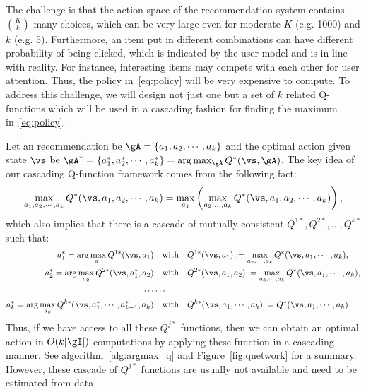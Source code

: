 \documentclass{article} %
\newcommand{\Le}[1]{{\color{red}{\bf\sf [ #1]}}}
\begin{document}
The challenge is that the action space of the recommendation system contains ${K \choose k}$ many choices, which can be very large even for moderate $K$ (e.g. 1000) and $k$ (e.g. 5). Furthermore, an item put in different combinations can have different probability of being clicked, which is indicated by the user model and is in line with reality. For instance, interesting items may compete with each other for user attention. Thus, the policy in~\eqref{eq:policy} will be very expensive to compute. To address this challenge, we will design not just one but a set of $k$ related Q-functions which will be used in a cascading fashion for finding the maximum in~\eqref{eq:policy}.

Let an recommendation be $\gA=\{a_1, a_2,\cdots, a_k\}$ and the optimal action given state $\vs$ be $\gA^* =\{a_1^*, a_2^*, \cdots, a_k^*\} =\arg\max_{\gA} Q^*(
\vs, \gA)$. The key idea of our cascading Q-function framework comes from the following fact:
{\small \begin{equation}\label{eq:max_decomp}
\max_{a_1,a_2,\cdots,a_k}Q^*(\vs,a_1,a_2,\cdots,a_k) = \max_{a_1}\left( \max_{a_2,\ldots,a_k}Q^*(\vs,a_1,a_2,\cdots,a_k) \right),
\end{equation}}
which also implies that there is a cascade of mutually consistent $Q^{1*},Q^{2*},\ldots,Q^{k*}$ such that:
{\small \begin{align*}
    a_1^* =\arg \max_{a_1}Q^{1*}(\vs, a_1) & \quad\text{with}\quad\displaystyle Q^{1*}(\vs, a_1):=\max_{a_2,\cdots,a_k}Q^*(\vs,a_1,\cdots, a_k),  \\
      a_2^* =\arg \max_{a_2}Q^{2*}(\vs, a_1^*, a_2) & \quad\text{with}\quad \displaystyle Q^{2*}(\vs, a_1, a_2):=\max_{a_3,\cdots,a_k}Q^*(\vs,a_1,\cdots, a_k), \\
      \cdots & \cdots \nonumber\\
      a_k^* = \arg \max_{a_k}Q^{k*}(\vs, a_1^*,\cdots,a_{k-1}^*, a_k) & \quad\text{with}\quad Q^{k*}(\vs, a_1, \cdots,a_k):=Q^*(\vs,a_1,\cdots, a_k).
\end{align*}}
Thus, if we have access to all these $Q^{j*}$ functions, then we can obtain an optimal action in $O(k|\gI|)$ computations by applying these function in a cascading manner. See algorithm~\ref{alg:argmax_q} and Figure~\ref{fig:qnetwork} for a summary. However, these cascade of $Q^{j*}$ functions are usually not available and need to be estimated from data.
\end{document}
